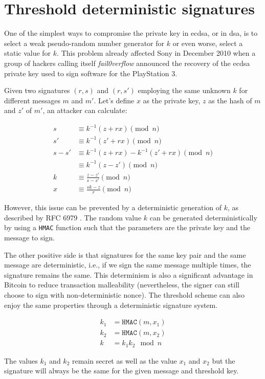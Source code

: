 \section{Threshold deterministic signatures}

One of the simplest ways to compromise the private key in \gls{ecdsa}, or in
\gls{dsa}, is to select a weak pseudo-random number generator for $k$ or even
worse, select a static value for $k$. This problem already affected Sony in
December 2010 when a group of hackers calling itself \textit{fail0verflow}
announced the recovery of the \gls{ecdsa} private key used to sign software for
the PlayStation 3.

Given two signatures $(r, s)$ and $(r, s')$ employing the same unknown $k$ for
different messages $m$ and $m'$. Let's define $x$ as the private key, $z$ as the
hash of $m$ and $z'$ of $m'$, an attacker can calculate:

\begin{equation*}
\begin{split}
  s &\equiv k^{-1} (z + rx) \pmod n \\
  s' &\equiv k^{-1} (z' + rx) \pmod n \\
  s - s' &\equiv k^{-1} (z + rx) - k^{-1} (z' + rx) \pmod n \\
         &\equiv k^{-1} (z - z') \pmod n \\
  k &\equiv \frac{z - z'}{s - s'} \pmod n \\
  x &\equiv \frac{sk - z}{r} \pmod n
\end{split}
\end{equation*}

However, this issue can be prevented by a deterministic generation of $k$, as
described by RFC 6979 \cite{rfc6979}. The random value $k$ can be generated
deterministically by using a \texttt{HMAC} function such that the parameters are
the private key and the message to sign.

The other positive side is that signatures for the same key pair and the same
message are deterministic, i.e., if we sign the same message multiple times, the
signature remains the same. This determinism is also a significant advantage in
Bitcoin to reduce transaction malleability (nevertheless, the signer can still
choose to sign with non-deterministic nonce). The threshold scheme can also
enjoy the same properties through a deterministic signature system.

\begin{equation*}
\begin{split}
  k_1 &= \texttt{HMAC}(m, x_1) \\
  k_2 &= \texttt{HMAC}(m, x_2) \\
  k &= k_1k_2 \mod n
\end{split}
\end{equation*}

The values $k_1$ and $k_2$ remain secret as well as the value $x_1$ and $x_2$
but the signature will always be the same for the given message and threshold
key.
